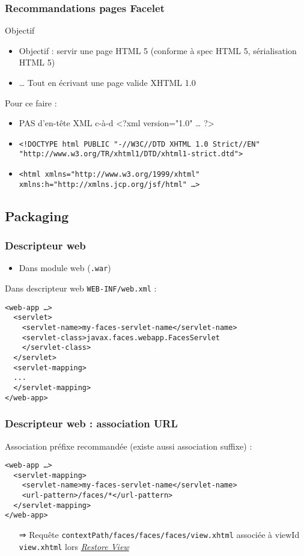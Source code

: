 \documentclass[english, french]{beamer}
\begin{document}
\begin{frame}
	\frametitle{Recommandations pages Facelet}
	\begin{block}{Objectif}
		\begin{itemize}
			\item Objectif : servir une page HTML 5 {\tiny (conforme à spec HTML 5, sérialisation HTML 5)}
			\item … Tout en écrivant une page valide XHTML 1.0
		\end{itemize}
	\end{block}
	Pour ce faire :
	\begin{itemize}
		\item PAS d’en-tête XML {\tiny c-à-d <?xml version="1.0" … ?>}
		\item \texttt{<!DOCTYPE html PUBLIC "-//W3C//DTD XHTML 1.0 Strict//EN" "http://www.w3.org/TR/xhtml1/DTD/xhtml1-strict.dtd">}
		\item \texttt{<html xmlns="http://www.w3.org/1999/xhtml" xmlns:h="http://xmlns.jcp.org/jsf/html" …>}
	\end{itemize}
\end{frame}

\subsection{Packaging}
\begin{frame}[fragile]
	\frametitle{Descripteur web}
	\begin{itemize}
		\item Dans module web (\texttt{.war})
	\end{itemize}
	Dans descripteur web \texttt{WEB-INF/web.xml} :
	\begin{lstlisting}[aboveskip=1em, belowskip=1em]
<web-app …>
  <servlet>
    <servlet-name>my-faces-servlet-name</servlet-name>
    <servlet-class>javax.faces.webapp.FacesServlet
    </servlet-class>
  </servlet>
  <servlet-mapping>
  ...
  </servlet-mapping>
</web-app>
	\end{lstlisting}
\end{frame}

\begin{frame}[fragile]
	\frametitle{Descripteur web : association URL}
	Association préfixe recommandée {\tiny (existe aussi association suffixe)} :
	\begin{lstlisting}[aboveskip=1em, belowskip=1em]
<web-app …>
  <servlet-mapping>
    <servlet-name>my-faces-servlet-name</servlet-name>
    <url-pattern>/faces/*</url-pattern>
  </servlet-mapping>
</web-app>
	\end{lstlisting}
	\begin{itemize}
		\item[⇒] Requête \texttt{contextPath/faces/faces/faces/view.xhtml} associée à viewId \texttt{view.xhtml} lors \hyperlink{ph-rv}{\emph{Restore View}}
	\end{itemize}
\end{frame}
\end{document}
